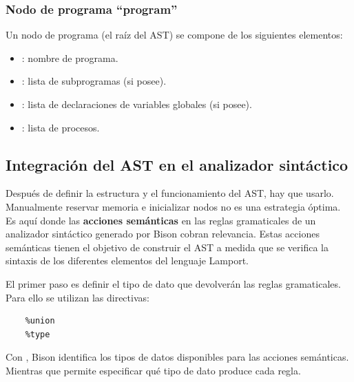 \subsubsection{Nodo de programa ``program''}
\noindent
Un nodo de programa (el raíz del AST) se compone de los siguientes elementos:
\begin{itemize}
    \item {}: nombre de programa.
    \item {}: lista de subprogramas (si posee).
    \item {}: lista de declaraciones de variables globales (si posee).
    \item {}: lista de procesos.
\end{itemize}

\subsection{Integración del AST en el analizador sintáctico}
Después de definir la estructura y el funcionamiento del AST, hay que usarlo. Manualmente reservar memoria e inicializar nodos no es una estrategia óptima. Es aquí donde las \textbf{acciones semánticas} en las reglas gramaticales de un analizador sintáctico generado por Bison cobran relevancia. Estas acciones semánticas tienen el objetivo de construir el AST a medida que se verifica la sintaxis de los diferentes elementos del lenguaje Lamport.

\vspace{0.5cm}
El primer paso es definir el tipo de dato que devolverán las reglas gramaticales. Para ello se utilizan las directivas:
\begin{verbatim}
    %union
    %type
\end{verbatim}

\vspace{0.5cm}
Con , Bison identifica los tipos de datos disponibles para las acciones semánticas. Mientras que  permite especificar qué tipo de dato produce cada regla.


